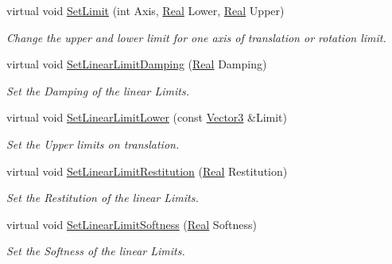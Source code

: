 \begin{DoxyCompactItemize}
virtual void \hyperlink{classphys_1_1Generic6DofConstraint_ad13819206ae8608c863ff3a137feb11f}{SetLimit} (int Axis, \hyperlink{namespacephys_af7eb897198d265b8e868f45240230d5f}{Real} Lower, \hyperlink{namespacephys_af7eb897198d265b8e868f45240230d5f}{Real} Upper)
\begin{DoxyCompactList}\small\item\em Change the upper and lower limit for one axis of translation or rotation limit. \item\end{DoxyCompactList}\item 
virtual void \hyperlink{classphys_1_1Generic6DofConstraint_a91eed672af7fb8aa98f442fec1104ced}{SetLinearLimitDamping} (\hyperlink{namespacephys_af7eb897198d265b8e868f45240230d5f}{Real} Damping)
\begin{DoxyCompactList}\small\item\em Set the Damping of the linear Limits. \item\end{DoxyCompactList}\item 
virtual void \hyperlink{classphys_1_1Generic6DofConstraint_ab5b5d63200ce82ade149e8977e34a044}{SetLinearLimitLower} (const \hyperlink{classphys_1_1Vector3}{Vector3} \&Limit)
\begin{DoxyCompactList}\small\item\em Set the Upper limits on translation. \item\end{DoxyCompactList}\item 
virtual void \hyperlink{classphys_1_1Generic6DofConstraint_a79c4de82f5af325038eba9c774c98a96}{SetLinearLimitRestitution} (\hyperlink{namespacephys_af7eb897198d265b8e868f45240230d5f}{Real} Restitution)
\begin{DoxyCompactList}\small\item\em Set the Restitution of the linear Limits. \item\end{DoxyCompactList}\item 
virtual void \hyperlink{classphys_1_1Generic6DofConstraint_a68543c0db9abd36d0dc2126840c77a74}{SetLinearLimitSoftness} (\hyperlink{namespacephys_af7eb897198d265b8e868f45240230d5f}{Real} Softness)
\begin{DoxyCompactList}\small\item\em Set the Softness of the linear Limits. \item\end{DoxyCompactList}\item 

\end{DoxyCompactItemize}
